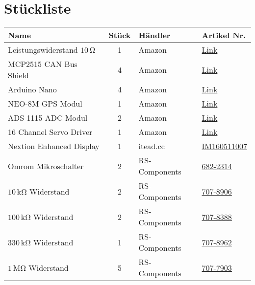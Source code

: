 \section{Stückliste}
\begin{table}[h]
    \centering
    \begin{threeparttable}
    \begin{tabular}{|l|c|M{3cm}|l|}
        \hline
    Name                         & Stück & Händler & Artikel Nr. \\\hline
    Leistungswiderstand $10\,\mathrm{\Omega}$ & 1 & Amazon & \href{https://www.amazon.de/-/en/sourcing-Aluminum-Housing-Mounted-Resistor/dp/B07H25VYM4/}{Link}\\
    MCP2515 CAN Bus Shield & 4 & Amazon & \href{https://www.amazon.de/-/en/AZDelivery-MCP2515-Shield-compatible-Arduino/dp/B086V3HLQ4}{Link}\\
    Arduino Nano           & 4 & Amazon & \href{https://www.amazon.de/gp/product/B078SBBST6}{Link}\\
    NEO-8M GPS Modul & 1 & Amazon & \href{https://www.amazon.de/-/en/gp/product/B07SQJ7Q6X}{Link}\\
    ADS 1115 ADC Modul & 2 & Amazon & \href{https://www.amazon.de/AZDelivery-ADS1115-Channels-Arduino-Raspberry/dp/B07QHWLTTS}{Link}\\
    16 Channel Servo Driver & 1 & Amazon & \href{https://www.amazon.de/Allrounder-PCA9685-Sunflower-16-Channel-Arduino-Raspberry/dp/B014KTSMLA}{Link}\\\hline
    Nextion Enhanced Display & 1 &  itead.cc & \href{https://www.itead.cc/nextion-nx8048k050.html}{IM160511007}\\\hline
    Omrom Mikroschalter & 2 & RS-Components & \href{https://at.rs-online.com/web/p/detektorschalter/6822314/}{682-2314}\\
    $10\,\mathrm{k\Omega}$ Widerstand & 2 & RS-Components &\href{https://at.rs-online.com/web/p/widerstande-durchsteckmontage/7078906/}{707-8906}\\
    $100\,\mathrm{k\Omega}$ Widerstand & 2 & RS-Components &\href{https://at.rs-online.com/web/p/widerstande-durchsteckmontage/7078388/}{707-8388}\\
    $330\,\mathrm{k\Omega}$ Widerstand & 1 & RS-Components &\href{https://at.rs-online.com/web/p/widerstande-durchsteckmontage/7078962/}{707-8962}\\
    $1\,\mathrm{M\Omega}$ Widerstand & 5 & RS-Components &\href{https://at.rs-online.com/web/p/widerstande-durchsteckmontage/7077903/}{707-7903}\\

\end{tabular}
\end{threeparttable}
\end{table}
